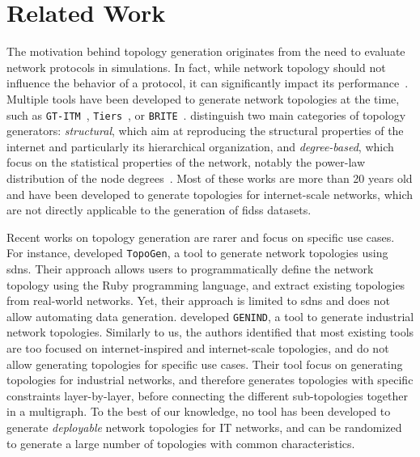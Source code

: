 \section{Related Work\label{sec:topologies.related}}

The motivation behind topology generation originates from the need to evaluate network protocols in simulations.
In fact, while network topology should not influence the behavior of a protocol, it can significantly impact its performance~\cite{tangmunarunkit_Networktopologygenerators_2002}.
Multiple tools have been developed to generate network topologies at the time, such as \texttt{GT-ITM}~\cite{calvert_ModelingInternettopology_1997}, \texttt{Tiers}~\cite{doar_bettermodelgenerating_1996}, or \texttt{BRITE}~\cite{medina_BRITEapproachuniversal_2001}.
\Textcite{tangmunarunkit_Networktopologygenerators_2002} distinguish two main categories of topology generators: \emph{structural}, which aim at reproducing the structural properties of the internet and particularly its hierarchical organization, and \emph{degree-based}, which focus on the statistical properties of the network, notably the power-law distribution of the node degrees~\cite{faloutsos_powerlawrelationshipsInternet_1999}.
Most of these works are more than 20 years old and have been developed to generate topologies for internet-scale networks, which are not directly applicable to the generation of \glspl{fids} datasets.

Recent works on topology generation are rarer and focus on specific use cases.
For instance, \textcite{laurito_TopoGennetworktopology_2017} developed \texttt{TopoGen}, a tool to generate network topologies using \glspl{sdn}.
Their approach allows users to programmatically define the network topology using the Ruby programming language, and extract existing topologies from real-world networks.
Yet, their approach is limited to \glspl{sdn} and does not allow automating data generation.
\Textcite{alrumaih_GENINDindustrialnetwork_2023} developed \texttt{GENIND}, a tool to generate industrial network topologies.
Similarly to us, the authors identified that most existing tools are too focused on internet-inspired and internet-scale topologies, and do not allow generating topologies for specific use cases.
Their tool focus on generating topologies for industrial networks, and therefore generates topologies with specific constraints layer-by-layer, before connecting the different sub-topologies together in a multigraph.
To the best of our knowledge, no tool has been developed to generate \emph{deployable} network topologies for IT networks, and can be randomized to generate a large number of topologies with common characteristics.
